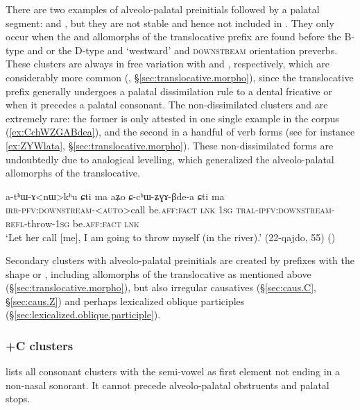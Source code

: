 There are two examples of alveolo-palatal preinitials followed by a palatal segment:  and , but they are not stable and hence not included in . They only occur when the  and  allomorphs of the translocative prefix are found before the B-type  and  or the D-type  and  `westward' and \textsc{downstream} orientation preverbs. These clusters are always in free variation with  and , respectively, which are considerably more common (, §\ref{sec:translocative.morpho}), since the translocative prefix generally undergoes a palatal dissimilation rule to a dental fricative  or  when it precedes a palatal consonant. The non-dissimilated clusters  and  are extremely rare: the former is only attested in one single example in the corpus (\ref{ex:CchWZGABdea}), and the second in a handful of verb forms (see for instance \ref{ex:ZYWlata}, §\ref{sec:translocative.morpho}). These non-dissimilated forms are undoubtedly due to analogical levelling, which generalized the alveolo-palatal allomorphs of the translocative.

\begin{exe}
	\ex \label{ex:CchWZGABdea}
	\gll a-tʰɯ-ɤ<nɯ>kʰu ɕti ma aʑo ɕ-cʰɯ-ʑɣɤ-βde-a ɕti ma \\
	\textsc{irr}-\textsc{pfv}:\textsc{downstream}-<\textsc{auto}>call be.\textsc{aff}:\textsc{fact} \textsc{lnk} \textsc{1sg} \textsc{tral}-\textsc{ipfv}:\textsc{downstream}-\textsc{refl}-throw-\textsc{1sg} be.\textsc{aff}:\textsc{fact} \textsc{lnk} \\
	\glt `Let her call [me], I am going to throw myself (in the river).' (22-qajdo, 55)
	()
\end{exe}

Secondary clusters with alveolo-palatal preinitials are created by prefixes with the shape  or , including allomorphs of the translocative as mentioned above (§\ref{sec:translocative.morpho}), but also irregular causatives (§\ref{sec:caus.C}, §\ref{sec:caus.Z}) and perhaps lexicalized oblique participles (§\ref{sec:lexicalized.oblique.participle}).

\subsubsection{+C clusters}  \label{sec:jC.clusters}
  lists all consonant clusters with the semi-vowel  as first element not ending in a non-nasal sonorant. It cannot precede alveolo-palatal obstruents and palatal stops.

